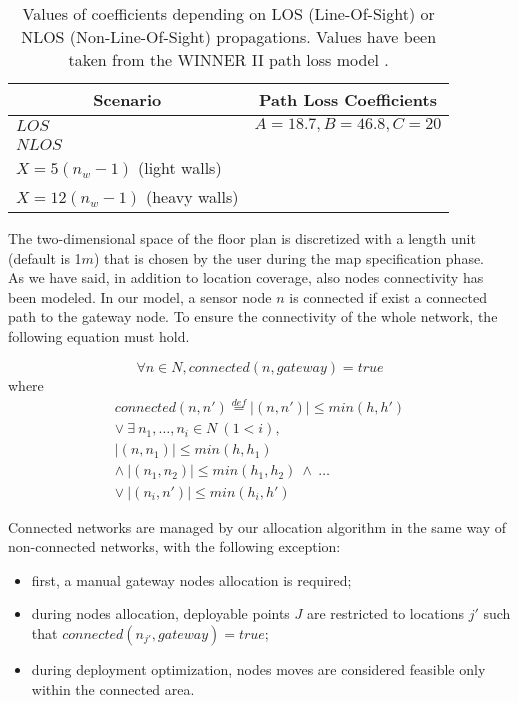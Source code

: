\begin{table}[h!tb]
\centering
\caption[Values of coefficients depending on LOS (Line-Of-Sight) or NLOS (Non-Line-Of-Sight) propagations.]{Values of coefficients depending on LOS (Line-Of-Sight) or NLOS (Non-Line-Of-Sight) propagations. Values have been taken from the WINNER II path loss model \cite{Kyosti2008}.}
\label{tab:pathloss}
\def\arraystretch{1.3}
\begin{tabular}{ | l | l |}
    \hline
    \multicolumn{1}{|c|}{\bfseries Scenario} & \multicolumn{1}{c|}{\bfseries Path Loss Coefficients} \\ \hline
    $LOS$ & $A=18.7, B=46.8, C=20$ \\ \hline
    $NLOS$ & \pbox{5cm}{
              $A=36.8, B=43.8, C=20$ \\
              $X=5(n_w-1)$ (light walls)\\
              $X=12(n_w-1)$ (heavy walls)
              } \\
    \hline
    \end{tabular}
    \end{table}

The two-dimensional space of the floor plan is discretized with a length unit (default is 1\(m\)) that is chosen by the user during the map specification phase.\\
As we have said, in addition to location coverage, also nodes connectivity has been modeled. In our model, a sensor node $n$ is connected if exist a connected path to the gateway node. To ensure the connectivity of the whole network, the following equation must hold.

\begin{equation}\label{eq:all_conn}
\forall n \in N, connected(n, gateway) = true 
\end{equation}
where
\begin{equation}\label{eq:connected}
\begin{gathered}
connected(n,n') \stackrel{def}{=} |(n,n')| \leq min(h,h')\\
\lor ~ \exists ~ n_1, \dots, n_i \in N ~ (1 < i),\\
|(n,n_1)| \leq min(h,h_1)\\
\land ~ |(n_1,n_2)| \leq min(h_1,h_2) ~\land ~ \dots\\
\lor ~ |(n_i,n')| \leq min(h_i, h')
\end{gathered}
\end{equation}

Connected networks are managed by our allocation algorithm in the same way of non-connected networks, with the following exception:
\begin{itemize}
\item first, a manual gateway nodes allocation is required;
\item during nodes allocation, deployable points $J$ are restricted to locations $j'$ such that \(connected(n_{j'}, gateway) = true\);
\item during deployment optimization, nodes moves are considered feasible only within the connected area.
\end{itemize}

